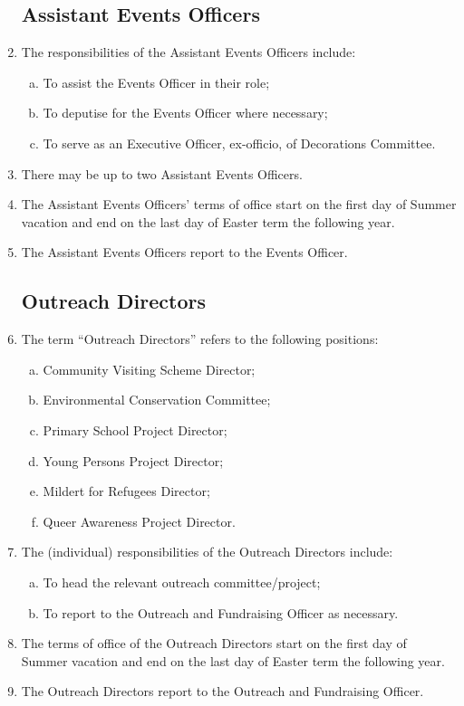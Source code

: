 \documentclass[12pt]{article}
\begin{document}
\begin{enumerate}
    \subsection{Assistant Events Officers}
    \item The responsibilities of the Assistant Events Officers include:
    \begin{enumerate}[(a)]
        \item To assist the Events Officer in their role;
        \item To deputise for the Events Officer where necessary;
        \item To serve as an Executive Officer, ex-officio, of Decorations Committee.
    \end{enumerate}
    \item There may be up to two Assistant Events Officers.
    \item The Assistant Events Officers' terms of office start on the first day of Summer vacation and end on the last day of Easter term the following year.
    \item The Assistant Events Officers report to the Events Officer.

    \subsection{Outreach Directors}
    \item\label{def:outreach-directors} The term ``Outreach Directors'' refers to the following positions:
    \begin{enumerate}[(a)]
        \item Community Visiting Scheme Director;
        \item Environmental Conservation Committee;
        \item Primary School Project Director;
        \item Young Persons Project Director;
        \item Mildert for Refugees Director;
        \item Queer Awareness Project Director.
    \end{enumerate}
    \item The (individual) responsibilities of the Outreach Directors include:
    \begin{enumerate}[(a)]
        \item To head the relevant outreach committee/project;
        \item To report to the Outreach and Fundraising Officer as necessary.
    \end{enumerate}
    \item The terms of office of the Outreach Directors start on the first day of Summer vacation and end on the last day of Easter term the following year.
    \item The Outreach Directors report to the Outreach and Fundraising Officer.


\end{enumerate}
\end{document}
